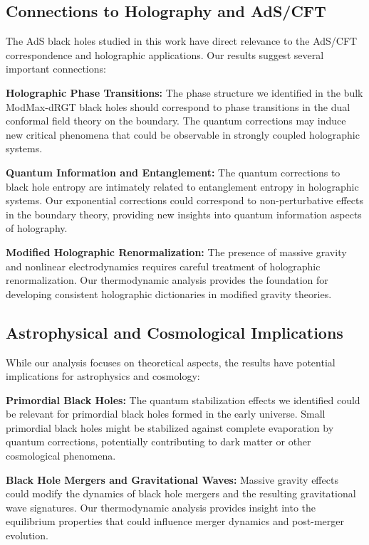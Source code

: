 \documentclass[superscriptaddress, prd, aps,amsmath,amssymb,showpacs,showkeys, onecolumn]{revtex4-2}
\begin{document}
\subsection{Connections to Holography and AdS/CFT}

The AdS black holes studied in this work have direct relevance to the AdS/CFT correspondence and holographic applications. Our results suggest several important connections:

\textbf{Holographic Phase Transitions:} The phase structure we identified in the bulk ModMax-dRGT black holes should correspond to phase transitions in the dual conformal field theory on the boundary. The quantum corrections may induce new critical phenomena that could be observable in strongly coupled holographic systems.

\textbf{Quantum Information and Entanglement:} The quantum corrections to black hole entropy are intimately related to entanglement entropy in holographic systems. Our exponential corrections could correspond to non-perturbative effects in the boundary theory, providing new insights into quantum information aspects of holography.

\textbf{Modified Holographic Renormalization:} The presence of massive gravity and nonlinear electrodynamics requires careful treatment of holographic renormalization. Our thermodynamic analysis provides the foundation for developing consistent holographic dictionaries in modified gravity theories.

\subsection{Astrophysical and Cosmological Implications}

While our analysis focuses on theoretical aspects, the results have potential implications for astrophysics and cosmology:

\textbf{Primordial Black Holes:} The quantum stabilization effects we identified could be relevant for primordial black holes formed in the early universe. Small primordial black holes might be stabilized against complete evaporation by quantum corrections, potentially contributing to dark matter or other cosmological phenomena.

\textbf{Black Hole Mergers and Gravitational Waves:} Massive gravity effects could modify the dynamics of black hole mergers and the resulting gravitational wave signatures. Our thermodynamic analysis provides insight into the equilibrium properties that could influence merger dynamics and post-merger evolution.
\end{document}
